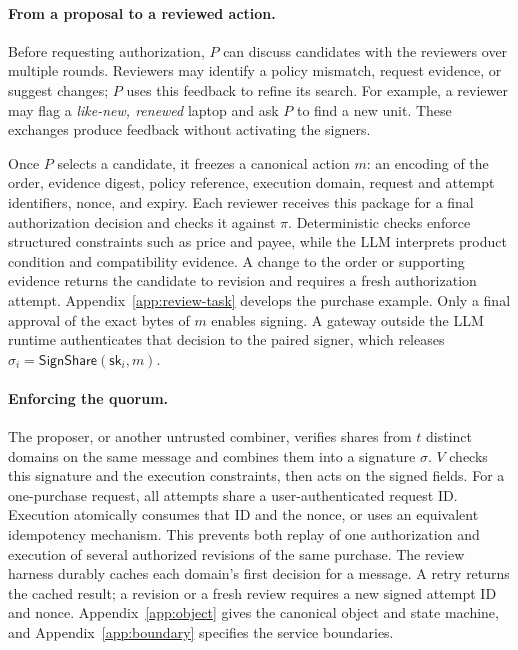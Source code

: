 \documentclass{article}
\newcommand{\sk}{\mathsf{sk}}
\begin{document}
\paragraph{From a proposal to a reviewed action.}
Before requesting authorization, $P$ can discuss candidates with the reviewers
over multiple rounds. Reviewers may identify a policy mismatch, request
evidence, or suggest changes; $P$ uses this feedback to refine its search.
For example, a reviewer may flag a \textit{like-new, renewed} laptop and ask
$P$ to find a new unit. These exchanges produce feedback without activating
the signers.

Once $P$ selects a candidate, it freezes a canonical action $m$: an  encoding of the order, evidence digest, policy reference,
execution domain, request and attempt identifiers, nonce, and expiry.
Each reviewer receives this package for a final authorization decision and
checks it against $\pi$. Deterministic checks enforce structured constraints
such as price and payee, while the LLM interprets product condition and
compatibility evidence. A change to the order or supporting evidence returns
the candidate to revision and requires a fresh authorization attempt.
Appendix~\ref{app:review-task} develops the purchase example.
Only a final approval of the exact bytes of $m$ enables signing. A gateway
outside the LLM runtime authenticates that decision to the paired signer, which releases
$\sigma_i=\mathsf{SignShare}(\sk_i,m)$. 
\paragraph{Enforcing the quorum.}
The proposer, or another untrusted combiner, verifies shares from $t$ distinct
domains on the same message and combines them into a signature $\sigma$.
$V$ checks this signature and the execution constraints, then acts on the
signed fields. For a one-purchase request, all attempts share a user-authenticated
request ID. Execution atomically consumes that ID and the nonce, or uses an
equivalent idempotency mechanism. This prevents both replay of one authorization
and execution of several authorized revisions of the same purchase.
The review harness durably caches each domain's first decision for a message.
A retry returns the cached result; a revision or a fresh review requires a
new signed attempt ID and nonce. 
Appendix~\ref{app:object} gives
the canonical object and state machine, and Appendix~\ref{app:boundary}
specifies the service boundaries.
\end{document}
